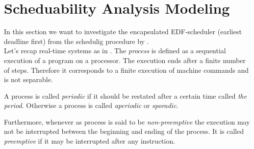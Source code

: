 \section{Scheduability Analysis Modeling}









In this section we want to investigate the encapsulated EDF-scheduler (earliest deadline first) from the schedulig procedure by \cite{K}. \\

Let's recap \glspl{real-time system} as in \cite{KBK}.
The {\itshape process} is defined as a sequential execution of a program on a processor. 
The execution ends after a finite number of steps. 
Therefore it corresponds to a finite execution of machine commands and is not separable.\\
\begin{definition}
	A process is called {\itshape periodic} if it should be restated after a certain time called {\itshape the period}. 
	Otherwise a process is called {\itshape aperiodic} or {\itshape sporadic}.


Furthermore, whenever as process is said to be {\itshape non-preemptive} the execution may not be interrupted between the beginning and ending of the process. 
It is called {\itshape preemptive} if it may be interrupted after any instruction.
\end{definition}  
 
